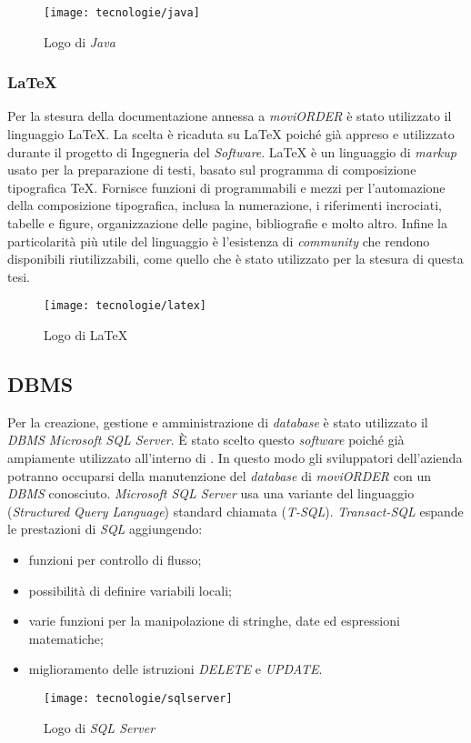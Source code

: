 \begin{figure}[!h] 
    \centering 
    \texttt{[image: tecnologie/java]} 
    \caption{Logo di \textit{Java}}
\end{figure}

\subsubsection{\LaTeX{}}

Per la stesura della documentazione annessa a \textit{moviORDER} è stato utilizzato il linguaggio \LaTeX{}. La scelta è ricaduta su \LaTeX{} poiché già appreso e utilizzato durante il progetto di Ingegneria del \textit{Software}. \LaTeX{} è un linguaggio di \textit{markup} usato per la preparazione di testi, basato sul programma di composizione tipografica \TeX{}. Fornisce funzioni di  programmabili e mezzi per l'automazione della composizione tipografica, inclusa la numerazione, i riferimenti incrociati, tabelle e figure, organizzazione delle pagine, bibliografie e molto altro. Infine la particolarità più utile del linguaggio è l'esistenza di \textit{community} che rendono disponibili  riutilizzabili, come quello che è stato utilizzato per la stesura di questa tesi.

\begin{figure}[!h] 
    \centering 
    \texttt{[image: tecnologie/latex]} 
    \caption{Logo di \LaTeX{}}
\end{figure}

\subsection{DBMS}

Per la creazione, gestione e amministrazione di \textit{database} è stato utilizzato il \textit{DBMS Microsoft SQL Server}. È stato scelto questo \textit{software} poiché già ampiamente utilizzato all'interno di \visione{}. In questo modo gli sviluppatori dell'azienda potranno occuparsi della manutenzione del \textit{database} di \textit{moviORDER} con un \textit{DBMS} conosciuto. \textit{Microsoft SQL Server} usa una variante del linguaggio  (\textit{Structured Query Language}) standard chiamata  (\textit{T-SQL}). \textit{Transact-SQL} espande le prestazioni di \textit{SQL} aggiungendo:
\begin{itemize}
	\item funzioni per controllo di flusso;
	\item possibilità di definire variabili locali;
	\item varie funzioni per la manipolazione di stringhe, date ed espressioni matematiche;
	\item miglioramento delle istruzioni \textit{DELETE} e \textit{UPDATE}.
\end{itemize}

\begin{figure}[!h] 
    \centering 
    \texttt{[image: tecnologie/sqlserver]} 
    \caption{Logo di \textit{SQL Server}}
\end{figure}